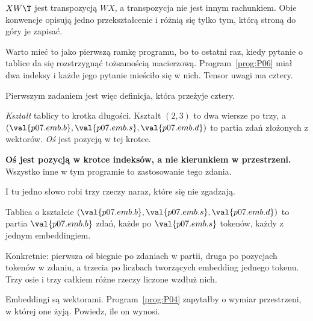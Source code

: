 \begin{fr}
$XW\T$ jest transpozycją $WX$, a transpozycja nie jest innym rachunkiem. Obie
konwencje opisują jedno przekształcenie i różnią się tylko tym, którą stroną
do góry je zapisać.

Warto mieć to jako pierwszą ramkę programu, bo to ostatni raz, kiedy pytanie o
tablice da się rozstrzygnąć tożsamością macierzową.
Program~\ref{prog:P06} miał dwa indeksy i każde jego pytanie mieściło się w
nich. Tensor uwagi ma cztery.
\end{fr}

\begin{fr}
Pierwszym zadaniem jest więc definicja, która przeżyje cztery.

\emph{Kształt} tablicy to krotka długości. Kształt $(2, 3)$ to dwa wiersze po
trzy, a $(\val{p07.emb.b}, \val{p07.emb.s}, \val{p07.emb.d})$ to partia zdań
złożonych z wektorów. \emph{Oś} jest pozycją w tej krotce.

\textbf{Oś jest pozycją w krotce indeksów, a nie kierunkiem w przestrzeni.}
Wszystko inne w tym programie to zastosowanie tego zdania.
\end{fr}

\begin{fr}
I tu jedno słowo robi trzy rzeczy naraz, które się nie zgadzają.

Tablica o kształcie $(\val{p07.emb.b}, \val{p07.emb.s}, \val{p07.emb.d})$ to
partia $\val{p07.emb.b}$ zdań, każde po $\val{p07.emb.s}$ tokenów, każdy z
jednym embeddingiem.

Konkretnie: pierwsza oś biegnie po zdaniach w partii, druga po pozycjach tokenów
w zdaniu, a trzecia po liczbach tworzących embedding jednego tokenu. Trzy osie i
trzy całkiem różne rzeczy liczone wzdłuż nich.

Embeddingi są wektorami. Program~\ref{prog:P04} zapytałby o wymiar przestrzeni,
w której one żyją. Powiedz, ile on wynosi.
\dotline
\nextframe
\end{fr}

